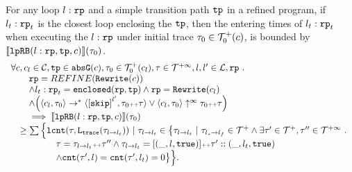 
\begin{lemma}
  \label{lemma:looprb-sound}
  For any loop $l: \mathtt{rp}$ and a simple transition path $\mathtt{tp}$ in a refined program, if $l_t: \mathtt{rp}_t$ is the closest loop enclosing the $\mathtt{tp}$, then the entering times of $l_t: \mathtt{rp}_t$ when executing the $l: \mathtt{rp}$ under initial trace $\mathtt{\tau}_0 \in \mathcal{T}^{+}_0(c)$, is bounded by $\llbracket \mathtt{lpRB}(l: \mathtt{rp}, \mathtt{tp}, c) \rrbracket(\mathtt{\tau}_0)$.
  \[
    \begin{array}{l}
    \forall c, c_l \in \cdom, \tpath \in \absG(c), \trace_0 \in \ftdom_0(c_l), \trace \in \tdom, l, l' \in \ldom, \rprog \sthat 
    \\ \qquad
    \rprog = REFINE(\algrewrite(c))
    \\ \qquad
    \land l_t: \rprog_t = \kw{enclosed}(\rprog, \tpath)
    \land 
    \rprog = \algrewrite(c_l)
    \\ \qquad
    \land
    \Big(
    \config{c_l, \trace_0} \to^* \config{\clabel{\eskip}^{l'}, \trace_0 \tracecat \trace}
    \lor \config{c_l, \trace_0} \uparrow^{\infty} \trace_0 \tracecat \trace 
    \Big)
    \\ \qquad
    \implies
    \econfig{\lpchB(l: \rprog, \tpath, c)}(\trace_0) 
    \\ \quad\geq 
      \sum\Big\{
      \lcounter(\trace, \tracel(\trace_{l \to l_t})) ~\vert~ \trace_{l \to l_t} \in 
      \big\{\trace_{l \to l_t} 
      ~\vert~ \trace_{l_s \to l_f}\in \ftdom 
      \land \exists  \trace' \in \ftdom, \trace''\in \tdom
      \sthat 
      \\ \quad\qquad \qquad
      \trace = \trace_{l \to l_t} \tracecat \trace''
      \land \trace_{l \to l_t} = [(\_, l, \etrue)] \tracecat \trace' :: (\_, l_t, \etrue)
      \\ \quad\qquad \qquad
      \land \counter(\trace', l) = \counter(\trace', l_t) = 0 
      \big\}
      \Big\}.
\end{array}
  \]
  \end{lemma}

